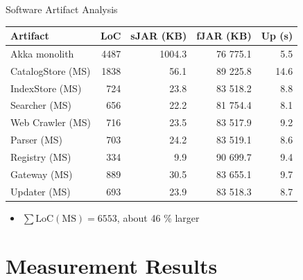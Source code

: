 \documentclass{beamer}
\begin{document}
\begin{frame}{Software Artifact Analysis}

\begin{table}
  \begin{tabular}{l|r|r|r|r}
    \textbf{Artifact} & \textbf{LoC} & \textbf{sJAR (KB)} & \textbf{fJAR (KB)} & \textbf{Up (s)}  \\ \hline
    Akka monolith     & 4487         & 1004.3             & 76 775.1           & 5.5                     \\ \hline
    CatalogStore (MS) & 1838         & 56.1               & 89 225.8           & 14.6                    \\ \hline
    IndexStore (MS)   & 724          & 23.8               & 83 518.2           & 8.8                     \\ \hline
    Searcher (MS)     & 656          & 22.2               & 81 754.4           & 8.1                     \\ \hline
    Web Crawler (MS)  & 716          & 23.5               & 83 517.9           & 9.2                     \\ \hline
    Parser (MS)       & 703          & 24.2               & 83 519.1           & 8.6                     \\ \hline
    Registry (MS)     & 334          & 9.9                & 90 699.7           & 9.4                     \\ \hline
    Gateway (MS)      & 889          & 30.5               & 83 655.1           & 9.7                     \\ \hline
    Updater (MS)      & 693          & 23.9               & 83 518.3           & 8.7                     \\ \hline
  \end{tabular}
\end{table}

\begin{itemize}
  \item $\sum\mbox{LoC}(\mbox{MS}) = 6553$, about 46 \% larger
\end{itemize}

\end{frame}


\section{Measurement Results}
\end{document}
